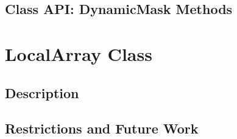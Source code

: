 \documentclass[english]{article}
\begin{document}
\subsection{Class API: DynamicMask Methods}
\label{ref:dynamicmask}

%
%
%
\section{LocalArray Class}
\subsection{Description}

%
%
%
%
%
%
\subsection{Restrictions and Future Work}

%
%
\end{document}
